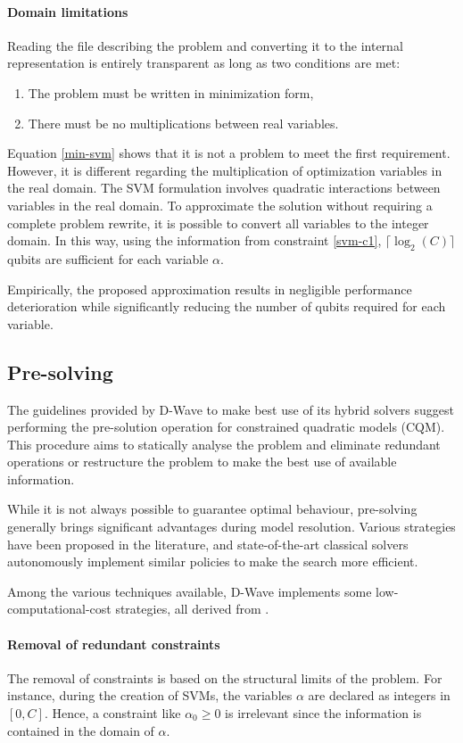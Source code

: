 \paragraph{Domain limitations} Reading the file describing the problem and converting it to the internal representation is entirely transparent as long as two conditions are met:
\begin{enumerate}
    \item The problem must be written in minimization form,
    \item There must be no multiplications between real variables.
\end{enumerate}
Equation \ref{min-svm} shows that it is not a problem to meet the first requirement. However, it is different regarding the multiplication of optimization variables in the real domain. The SVM formulation involves quadratic interactions between variables in the real domain. To approximate the solution without requiring a complete problem rewrite, it is possible to convert all variables to the integer domain. In this way, using the information from constraint \ref{svm-c1}, $\lceil\log_2(C)\rceil$ qubits are sufficient for each variable $\alpha$.

Empirically, the proposed approximation results in negligible performance deterioration while significantly reducing the number of qubits required for each variable.

\subsection{Pre-solving}

The guidelines provided by D-Wave to make best use of its hybrid solvers suggest performing the pre-solution operation for constrained quadratic models (CQM). This procedure aims to statically analyse the problem and eliminate redundant operations or restructure the problem to make the best use of available information.

While it is not always possible to guarantee optimal behaviour, pre-solving generally brings significant advantages during model resolution. Various strategies have been proposed in the literature, and state-of-the-art classical solvers autonomously implement similar policies to make the search more efficient.

Among the various techniques available, D-Wave implements some low-computational-cost strategies, all derived from  \cite{PRESOLVE}.

\paragraph{Removal of redundant constraints} The removal of constraints is based on the structural limits of the problem. For instance, during the creation of SVMs, the variables $\alpha$ are declared as integers in $[0, C]$. Hence, a constraint like $\alpha_0 \geq 0$ is irrelevant since the information is contained in the domain of $\alpha$.

